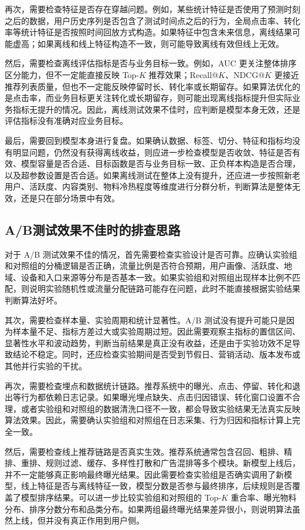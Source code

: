 \documentclass[UTF8]{ctexart}
\begin{document}
再次，需要检查特征是否存在穿越问题。例如，某些统计特征是否使用了预测时刻之后的数据，用户历史序列是否包含了测试时间点之后的行为，全局点击率、转化率等统计特征是否按照时间回放方式构造。如果特征中包含未来信息，离线结果可能虚高；如果离线和线上特征构造不一致，则可能导致离线有效但线上无效。

然后，需要检查离线评估指标是否与业务目标一致。例如，AUC 更关注整体排序区分能力，但不一定能直接反映 Top-\(K\) 推荐效果；Recall@\(K\)、NDCG@\(K\) 更接近推荐列表质量，但也不一定能反映停留时长、转化率或长期留存。如果算法优化的是点击率，而业务目标更关注转化或长期留存，则可能出现离线指标提升但实际业务指标无提升的情况。因此，离线测试效果不佳时，应判断是模型本身无效，还是评估指标没有准确对应业务目标。

最后，需要回到模型本身进行复盘。如果确认数据、标签、切分、特征和指标均没有明显问题，仍然没有获得离线收益，则应进一步检查模型是否收敛、特征是否有效、模型容量是否合适、目标函数是否与业务目标一致、正负样本构造是否合理，以及超参数设置是否合适。如果离线测试在整体上没有提升，还应进一步按照新老用户、活跃度、内容类别、物料冷热程度等维度进行分群分析，判断算法是整体无效，还是只在部分场景中有效。

\subsection{A/B测试效果不佳时的排查思路}

对于 A/B 测试效果不佳的情况，首先需要检查实验设计是否可靠。应确认实验组和对照组的分桶逻辑是否正确，流量比例是否符合预期，用户画像、活跃度、地域、设备和入口来源等分布是否基本一致。如果实验组和对照组出现样本比例不匹配，则说明实验随机性或流量分配链路可能存在问题，此时不能直接根据实验结果判断算法好坏。

其次，需要检查样本量、实验周期和统计显著性。A/B 测试没有提升可能只是因为样本量不足、指标方差过大或实验周期过短。因此需要观察主指标的置信区间、显著性水平和波动趋势，判断当前结果是真正没有收益，还是由于实验功效不足导致结论不稳定。同时，还应检查实验期间是否受到节假日、营销活动、版本发布或其他并行实验的干扰。

再次，需要检查埋点和数据统计链路。推荐系统中的曝光、点击、停留、转化和退出等行为都依赖日志记录。如果曝光埋点缺失、点击归因错误、转化窗口设置不合理，或者实验组和对照组的数据清洗口径不一致，都会导致实验结果无法真实反映算法效果。因此，需要确认实验组和对照组在日志采集、行为归因和指标计算上完全一致。

然后，需要检查线上推荐链路是否真实生效。推荐系统通常包含召回、粗排、精排、重排、规则过滤、缓存、多样性打散和广告混排等多个模块。新模型上线后，并不一定能够真正影响最终曝光结果。因此需要检查实验组是否确实调用了新模型，线上特征是否与离线特征一致，模型分数是否参与最终排序，后续规则是否覆盖了模型排序结果。可以进一步比较实验组和对照组的 Top-\(K\) 重合率、曝光物料分布、排序分数分布和品类分布。如果两组最终曝光结果差异很小，则说明算法虽然上线，但并没有真正作用到用户侧。
\end{document}
